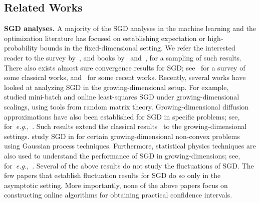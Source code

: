 \documentclass[11pt, reqno,english]{amsart}
\begin{document}
\subsection{Related Works}

\textbf{SGD analyses.} A majority of the SGD analyses in the machine learning and the optimization literature has focused on establishing expectation or high-probability bounds in the fixed-dimensional setting. We refer the interested reader to the survey by~\cite{bottou2018optimization}, and books by~\cite{bubeck2015convex} and~\cite{lan2020first}, for a sampling of such results. There also exists almost sure convergence results for SGD; see~\cite{harold1997stochastic} for a survey of some classical works, and~\cite{mertikopoulos2020almost,sebbouh2021almost,liu2022almost} for some recent works. Recently, several works have looked at analyzing SGD in the growing-dimensional setup. For example,~\cite{paquette2021sgd, paquette2021dynamics, paquette2022homogenization,paquetteimplicit2022} studied mini-batch and online least-squares SGD under growing-dimensional scalings, using tools from random matrix theory. Growing-dimensional diffusion approximations have also been established for SGD in specific problems; see, for~\emph{e.g.},~\cite{wang2017scaling, tan2019online, arous2021online, aroushigh2022,balasubramanian2023high}. Such results extend the classical results~\cite{borkar2009stochastic,benveniste2012adaptive} to the growing-dimensional settings. \cite{chandrasekher2021sharp} study SGD in for certain growing-dimensional non-convex problems using Gaussian process techniques. Furthermore, statistical physics techniques are also used to understand the performance of SGD in growing-dimensions; see, for~\emph{e.g.},~\cite{celentano2021high,gerbelot2022rigorous}. Several of the above results do not study the fluctuations of  SGD. The few papers that establish fluctuation results for SGD do so only in the asymptotic setting. More importantly, none of the above papers focus on constructing online algorithms for obtaining practical confidence intervals. 
\end{document}
